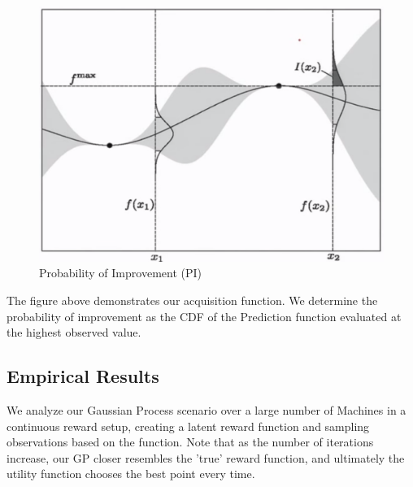 \documentclass{article}
\begin{document}
\begin{figure}[H]
\centering
\includegraphics[scale=0.4]{Prob_Improvement.png}
\caption{Probability of Improvement (PI)}
\end{figure}

The figure above demonstrates our acquisition function. We determine the probability of improvement as the CDF of the Prediction function evaluated at the highest observed value.

\subsection{Empirical Results}

We analyze our Gaussian Process scenario over a large number of Machines in a continuous reward setup, creating a latent reward function and sampling observations based on the function. Note that as the number of iterations increase, our GP closer resembles the 'true' reward function, and ultimately the utility function chooses the best point every time.\\
\end{document}
